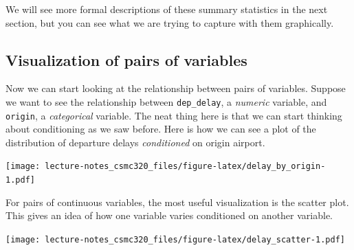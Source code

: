 \documentclass[12pt,]{book}
\newenvironment{Shaded}{\begin{snugshade}}{\end{snugshade}}
\newcommand{\KeywordTok}[1]{\textcolor[rgb]{0.13,0.29,0.53}{\textbf{#1}}}
\newcommand{\DataTypeTok}[1]{\textcolor[rgb]{0.13,0.29,0.53}{#1}}
\newcommand{\DecValTok}[1]{\textcolor[rgb]{0.00,0.00,0.81}{#1}}
\newcommand{\StringTok}[1]{\textcolor[rgb]{0.31,0.60,0.02}{#1}}
\newcommand{\OtherTok}[1]{\textcolor[rgb]{0.56,0.35,0.01}{#1}}
\newcommand{\OperatorTok}[1]{\textcolor[rgb]{0.81,0.36,0.00}{\textbf{#1}}}
\newcommand{\NormalTok}[1]{#1}
\theoremstyle{definition}
\theoremstyle{definition}
\theoremstyle{definition}
\theoremstyle{remark}
\begin{document}
We will see more formal descriptions of these summary statistics in the
next section, but you can see what we are trying to capture with them
graphically.

\subsection{Visualization of pairs of
variables}\label{visualization-of-pairs-of-variables}

Now we can start looking at the relationship between pairs of variables.
Suppose we want to see the relationship between \texttt{dep\_delay}, a
\emph{numeric} variable, and \texttt{origin}, a \emph{categorical}
variable. The neat thing here is that we can start thinking about
conditioning as we saw before. Here is how we can see a plot of the
distribution of departure delays \emph{conditioned} on origin airport.

\begin{Shaded}
\end{Shaded}

\texttt{[image: lecture-notes\_csmc320\_files/figure-latex/delay\_by\_origin-1.pdf]}

For pairs of continuous variables, the most useful visualization is the
scatter plot. This gives an idea of how one variable varies conditioned
on another variable.

\begin{Shaded}
\end{Shaded}

\texttt{[image: lecture-notes\_csmc320\_files/figure-latex/delay\_scatter-1.pdf]}
\end{document}
